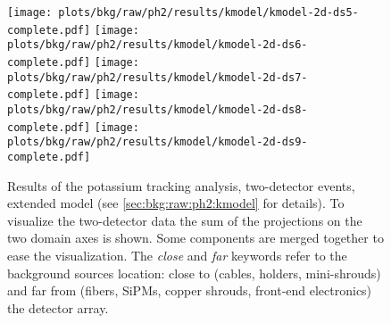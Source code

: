\begin{figure}
  \centering
  \texttt{[image: plots/bkg/raw/ph2/results/kmodel/kmodel-2d-ds5-complete.pdf]}
  \texttt{[image: plots/bkg/raw/ph2/results/kmodel/kmodel-2d-ds6-complete.pdf]}\vspace{10pt}
  \texttt{[image: plots/bkg/raw/ph2/results/kmodel/kmodel-2d-ds7-complete.pdf]}
  \texttt{[image: plots/bkg/raw/ph2/results/kmodel/kmodel-2d-ds8-complete.pdf]}\vspace{10pt}
  \texttt{[image: plots/bkg/raw/ph2/results/kmodel/kmodel-2d-ds9-complete.pdf]}
  \begin{minipage}[b][5.65cm][c]{0.45\textwidth}
    \hspace{15pt}%
    \parbox{0.91\textwidth}{%
      Results of the potassium tracking analysis, two-detector events, extended model (see
      \cref{sec:bkg:raw:ph2:kmodel} for details). To visualize the two-detector data the
      sum of the projections on the two domain axes is shown. Some components are merged
      together to ease the visualization. The \emph{close} and \emph{far} keywords refer
      to the background sources location: close to (cables, holders, mini-shrouds) and far
      from (fibers, SiPMs, copper shrouds, front-end electronics) the detector array.
    }
  \end{minipage}
\end{figure}


